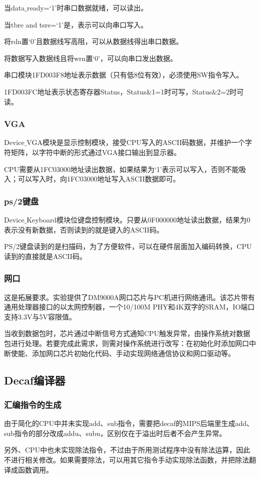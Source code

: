 当data$\_$ready=‘1’时串口数据就绪，可以读出。

当tbre and tsre=‘1’是，表示可以向串口写入。

将rdn置‘0’且数据线写高阻，可以从数据线得出串口数据。

将数据写入数据线且将wrn置‘0’，可以向串口发出数据。

串口模块1FD003F8地址表示数据（只有低8位有效），必须使用SW指令写入。

1FD003FC地址表示状态寄存器Status，Status$\&$1=1时可写，Status$\&$2=2时可读。
\subsubsection{VGA}
Device$\_$VGA模块是显示控制模块，接受CPU写入的ASCII码数据，并维护一个字符矩阵，以字符中断的形式通过VGA接口输出到显示器。

CPU需要从1FC03000地址读出数据，如果结果为‘1’表示可以写入，否则不能吸入；可以写入时，向1FC03000地址写入ASCII数据即可。
\subsubsection{ps/2键盘}
Device$\_$Keyboard模块位键盘控制模块。只要从0F000000地址读出数据，结果为0表示没有新数据，否则读到的就是键入的ASCII码。

PS/2键盘读到的是扫描码，为了方便软件，可以在硬件层面加入编码转换，CPU读到的直接就是ASCII码。
\subsubsection{网口}
这是拓展要求。实验提供了DM9000A网口芯片与PC机进行网络通讯。该芯片带有通用处理器接口的以太网控制器，一个10/100M PHY和4K双字的SRAM，IO端口支持3.3V与5V容限值。

当收到数据包时，芯片通过中断信号方式通知CPU触发异常，由操作系统对数据包进行处理。若要完成此需求，则需对操作系统进行改写：在初始化时添加网口中断使能、添加网口芯片初始化代码、手动实现网络通信协议和网口驱动等。
\subsection{Decaf编译器}
\subsubsection{汇编指令的生成}
由于简化的CPU中并未实现add、sub指令，需要把decaf的MIPS后端里生成add、sub指令的部分改成addu、subu，区别仅在于溢出时后者不会产生异常。

另外、CPU中也未实现除法指令，不过由于所用测试程序中没有除法运算，因此不进行相关修改。如果需要除法，可以用其它指令手动实现除法函数，并把除法翻译成函数调用。
